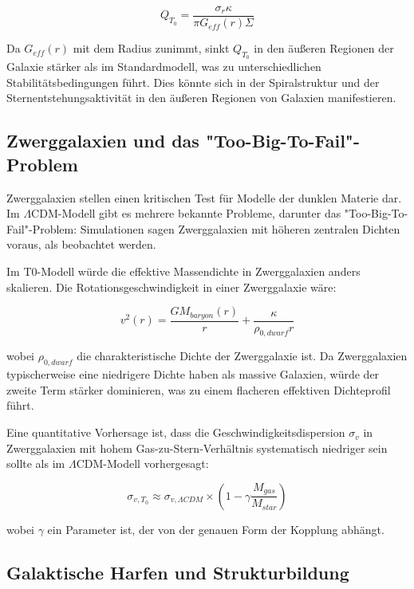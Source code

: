 \documentclass[a4paper,12pt]{article}
\begin{document}
	\begin{equation}
		Q_{T_0} = \frac{\sigma_r \kappa}{\pi G_{eff}(r) \Sigma}
	\end{equation}
	
	Da $G_{eff}(r)$ mit dem Radius zunimmt, sinkt $Q_{T_0}$ in den äußeren Regionen der Galaxie stärker als im Standardmodell, was zu unterschiedlichen Stabilitätsbedingungen führt. Dies könnte sich in der Spiralstruktur und der Sternentstehungsaktivität in den äußeren Regionen von Galaxien manifestieren.
	
	\subsection{Zwerggalaxien und das "Too-Big-To-Fail"-Problem}
	
	Zwerggalaxien stellen einen kritischen Test für Modelle der dunklen Materie dar. Im $\Lambda$CDM-Modell gibt es mehrere bekannte Probleme, darunter das "Too-Big-To-Fail"-Problem: Simulationen sagen Zwerggalaxien mit höheren zentralen Dichten voraus, als beobachtet werden.
	
	Im T0-Modell würde die effektive Massendichte in Zwerggalaxien anders skalieren. Die Rotationsgeschwindigkeit in einer Zwerggalaxie wäre:
	
	\begin{equation}
		v^2(r) = \frac{GM_{baryon}(r)}{r} + \frac{\kappa}{\rho_{0,dwarf}r}
	\end{equation}
	
	wobei $\rho_{0,dwarf}$ die charakteristische Dichte der Zwerggalaxie ist. Da Zwerggalaxien typischerweise eine niedrigere Dichte haben als massive Galaxien, würde der zweite Term stärker dominieren, was zu einem flacheren effektiven Dichteprofil führt.
	
	Eine quantitative Vorhersage ist, dass die Geschwindigkeitsdispersion $\sigma_v$ in Zwerggalaxien mit hohem Gas-zu-Stern-Verhältnis systematisch niedriger sein sollte als im $\Lambda$CDM-Modell vorhergesagt:
	
	\begin{equation}
		\sigma_{v,T_0} \approx \sigma_{v,\Lambda CDM} \times \left(1 - \gamma \frac{M_{gas}}{M_{star}}\right)
	\end{equation}
	
	wobei $\gamma$ ein Parameter ist, der von der genauen Form der Kopplung abhängt.
	
	\subsection{Galaktische Harfen und Strukturbildung}
	
\end{document}

